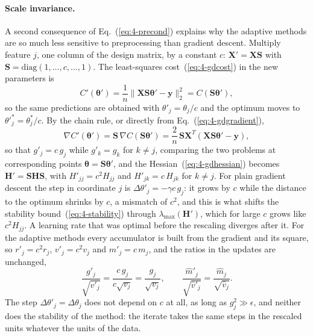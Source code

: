 \paragraph{Scale invariance.}
A second consequence of Eq.~(\ref{eq:4-precond}) explains why the adaptive
methods are so much less sensitive to preprocessing than gradient descent.
Multiply feature $j$, one column of the design matrix, by a constant $c$:
$\bm{X}'=\bm{X}\bm{S}$ with $\bm{S}=\mathrm{diag}(1,\dots,c,\dots,1)$.  The
least-squares cost~(\ref{eq:4-gdcost}) in the new parameters is
\[
  C'(\bm{\theta}')=\frac1n\|\bm{X}\bm{S}\bm{\theta}'-\bm{y}\|_2^{2}=C(\bm{S}\bm{\theta}'),
\]
so the same predictions are obtained with $\theta'_j=\theta_j/c$ and the
optimum moves to $\theta'^{*}_j=\theta^{*}_j/c$.  By the chain rule, or
directly from Eq.~(\ref{eq:4-gdgradient}),
\[
  \nabla C'(\bm{\theta}')=\bm{S}\,\nabla C(\bm{S}\bm{\theta}')
  =\frac2n\,\bm{S}\bm{X}^{T}(\bm{X}\bm{S}\bm{\theta}'-\bm{y}),
\]
so that $g'_j=c\,g_j$ while $g'_k=g_k$ for $k\neq j$,
comparing the two problems at corresponding points $\bm{\theta}=\bm{S}\bm{\theta}'$,
and the Hessian~(\ref{eq:4-gdhessian}) becomes $\bm{H}'=\bm{S}\bm{H}\bm{S}$,
with $H'_{jj}=c^{2}H_{jj}$ and $H'_{jk}=c\,H_{jk}$ for $k\neq j$.  For plain
gradient descent the step in coordinate $j$ is $\Delta\theta'_j=-\gamma c\,g_j$:
it grows by $c$ while the distance to the optimum shrinks by $c$, a mismatch
of $c^{2}$, and this is what shifts the stability bound~(\ref{eq:4-stability})
through $\lambda_{\max}(\bm{H}')$, which for large $c$ grows like $c^{2}H_{jj}$.
A learning rate that was optimal before the rescaling diverges after it.
For the adaptive methods every accumulator is built from the gradient and its
square, so $r'_j=c^{2}r_j$, $v'_j=c^{2}v_j$ and $m'_j=c\,m_j$, and the ratios
in the updates are unchanged,
\[
  \frac{g'_j}{\sqrt{v'_j}}=\frac{c\,g_j}{c\sqrt{v_j}}=\frac{g_j}{\sqrt{v_j}},
  \qquad
  \frac{\hat m'_j}{\sqrt{\hat v'_j}}=\frac{\hat m_j}{\sqrt{\hat v_j}}.
\]
The step $\Delta\theta'_j=\Delta\theta_j$ does not depend on $c$ at all, as
long as $g_j^{2}\gg\epsilon$, and neither does the stability of the method:
the iterate takes the same steps in the rescaled units whatever the units of
the data.

